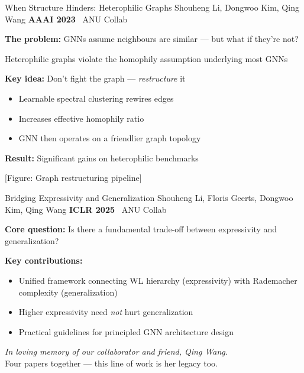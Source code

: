\documentclass[aspectratio=169,11pt]{beamer}
\newcommand{\papercite}[1]{{\scriptsize\color{mutedText}#1}}
\newcommand{\venue}[1]{{\small\textcolor{postechBlue}{\textbf{#1}}}}
\newcommand{\anucollab}{\faHandshake~\textcolor{anuGold}{\scriptsize ANU Collab}}
\begin{document}
\begin{frame}{When Structure Hinders: Heterophilic Graphs}
  \papercite{Shouheng Li, Dongwoo Kim, Qing Wang \hfill \venue{AAAI 2023} \anucollab}
  \vspace{8pt}

  \textbf{The problem:} GNNs assume neighbours are similar --- but what if they're \alert{not}?
  \vspace{6pt}

  Heterophilic graphs violate the homophily assumption underlying most GNNs
  \vspace{4pt}

  \textbf{Key idea:} Don't fight the graph --- \textit{restructure} it
  \begin{itemize}
    \item Learnable spectral clustering rewires edges
    \item Increases effective homophily ratio
    \item GNN then operates on a friendlier graph topology
  \end{itemize}
  \vspace{8pt}

  \textbf{Result:} Significant gains on heterophilic benchmarks

  \begin{center}
    {\small\color{mutedText}[Figure: Graph restructuring pipeline]}
  \end{center}
\end{frame}

\begin{frame}{Bridging Expressivity and Generalization}
  \papercite{Shouheng Li, Floris Geerts, Dongwoo Kim, Qing Wang \hfill \venue{ICLR 2025} \anucollab}
  \vspace{8pt}

  \textbf{Core question:} Is there a fundamental trade-off between expressivity and generalization?
  \vspace{6pt}

  \textbf{Key contributions:}
  \begin{itemize}
    \item Unified framework connecting WL hierarchy (expressivity) with Rademacher complexity (generalization)
    \item Higher expressivity need \textit{not} hurt generalization
    \item Practical guidelines for principled GNN architecture design
  \end{itemize}
  \vspace{6pt}

  \begin{block}{}
    \centering
    \textit{In loving memory of our collaborator and friend, Qing Wang.}\\
    {\scriptsize Four papers together --- this line of work is her legacy too.}
  \end{block}
\end{frame}
\end{document}
